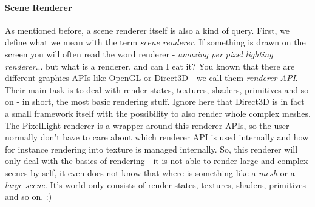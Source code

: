 \paragraph{Scene Renderer}
As mentioned before, a scene renderer itself is also a kind of query. First, we define what we mean with the term \emph{scene renderer}. If something is drawn on the screen you will often read the word renderer - \emph{amazing per pixel lighting renderer}... but what is a renderer, and can I eat it? You known that there are different graphics \ac{API}s like \ac{OpenGL} or Direct3D - we call them \emph{renderer \ac{API}}. Their main task is to deal with render states, textures, shaders, primitives and so on - in short, the most basic rendering stuff. Ignore here that Direct3D is in fact a small framework itself with the possibility to also render whole complex meshes. The PixelLight renderer is a wrapper around this renderer \ac{API}s, so the user normally don't have to care about which renderer \ac{API} is used internally and how for instance rendering into texture is managed internally. So, this renderer will only deal with the basics of rendering - it is not able to render large and complex scenes by self, it even does not know that where is something like a \emph{mesh} or a \emph{large scene}. It's world only consists of render states, textures, shaders, primitives and so on. :)

